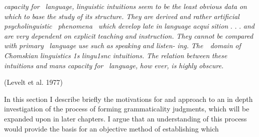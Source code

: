 \begin{styleStandard}
\textit{capacity}\textit{ }\textit{for }\textit{\ }\textit{language,}\textit{ }\textit{linguistic}\textit{ }\textit{intuitions}\textit{ }\textit{seem}\textit{ }\textit{to}\textit{ }\textit{be}\textit{ }\textit{the}\textit{ }\textit{least}\textit{ }\textit{obvious}\textit{ }\textit{data}\textit{ }\textit{on}\textit{ }\textit{which}\textit{ }\textit{to}\textit{ }\textit{base}\textit{ }\textit{the}\textit{ }\textit{study}\textit{ }\textit{of}\textit{ }\textit{its}\textit{ }\textit{structure.}\textit{ }\textit{They}\textit{ }\textit{are}\textit{ }\textit{derived}\textit{ }\textit{and}\textit{ }\textit{rather}\textit{ }\textit{artificial}\textit{ }\textit{psycholinguistic }\textit{\ }\textit{phenomena }\textit{\ }\textit{which}\textit{ }\textit{develop}\textit{ }\textit{late}\textit{ }\textit{in}\textit{ }\textit{language}\textit{ }\textit{acqui\-}\textit{ }\textit{sition}\textit{ }. . . \textit{and}\textit{ }\textit{are}\textit{ }\textit{very}\textit{ }\textit{dependent}\textit{ }\textit{on}\textit{ }\textit{explicit}\textit{ }\textit{teaching}\textit{ }\textit{and}\textit{ }\textit{instruction.}\textit{ }\textit{They}\textit{ }\textit{cannot}\textit{ }\textit{be}\textit{ }\textit{compared}\textit{ }\textit{with}\textit{ }\textit{primary }\textit{\ }\textit{language}\textit{ }\textit{use}\textit{ }\textit{such}\textit{ }\textit{as}\textit{ }\textit{speaking}\textit{ }\textit{and}\textit{ }\textit{listen-}\textit{ }\textit{ing.}\textit{ }\textit{The\ \ domain}\textit{ }\textit{of}\textit{ }\textit{Chomskian}\textit{ }\textit{linguistics}\textit{ }\textit{1s}\textit{ }\textit{lingu1snc}\textit{ }\textit{intuitions.}\textit{ }\textit{The}\textit{ }\textit{relation}\textit{ }\textit{between}\textit{ }\textit{these}\textit{ }\textit{intuitions}\textit{ }\textit{and}\textit{ }\textit{man{\textquotesingle}s}\textit{ }\textit{capacity}\textit{ }\textit{for }\textit{\ }\textit{language,}\textit{ }\textit{how\-}\textit{ }\textit{ever,}\textit{ }\textit{is}\textit{ }\textit{highly}\textit{ }\textit{obscure.}
\end{styleStandard}


\begin{styleStandard}
(Levelt et al. 1977)
\end{styleStandard}


\begin{styleTextbody}
In this section I describe briefly the motivations for and approach to an in\- depth investigation of the process of forming grammaticality judgments, which will be expanded upon in later chapters. I argue that an understanding of this process would provide the basis for an objective method of establishing which
\end{styleTextbody}


